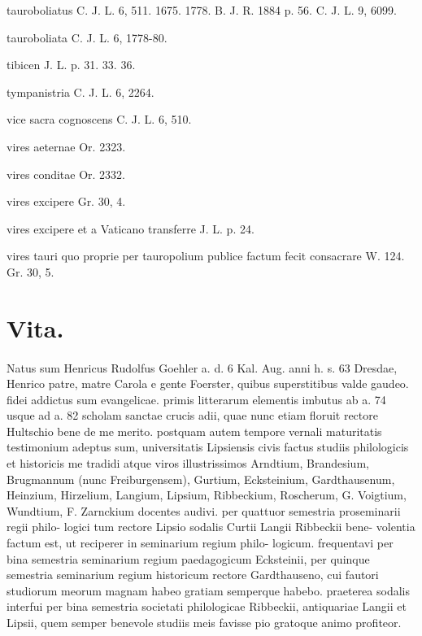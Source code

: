 \documentclass[a4paper, 11pt, oneside, polutonikogreek, german]{article}
\begin{document}
tauroboliatus C. J. L. 6, 511. 1675. 1778. B. J. R. 1884 p. 56. C. J. L. 9, 6099.

tauroboliata C. J. L. 6, 1778-80.

tibicen J. L. p. 31. 33. 36.

tympanistria C. J. L. 6, 2264.

vice sacra cognoscens C. J. L. 6, 510.

vires aeternae Or. 2323.

vires conditae Or. 2332.

vires excipere Gr. 30, 4.

vires excipere et a Vaticano transferre J. L. p. 24.

vires tauri quo proprie per tauropolium publice factum fecit consacrare W. 124. Gr. 30, 5.
\clearpage
\section{Vita.}
\paragraph{}
Natus sum Henricus Rudolfus Goehler a. d. 6 Kal. Aug. anni h. s. 63 Dresdae, Henrico patre, matre Carola e gente Foerster, quibus superstitibus valde gaudeo. fidei addictus sum evangelicae. primis litterarum elementis imbutus ab a. 74 usque ad a. 82 scholam sanctae crucis adii, quae nunc etiam floruit rectore Hultschio bene de me merito. postquam autem tempore vernali maturitatis testimonium adeptus sum, universitatis Lipsiensis civis factus studiis philologicis et historicis me tradidi atque viros illustrissimos Arndtium, Brandesium, Brugmannum (nunc Freiburgensem), Gurtium, Ecksteinium, Gardthausenum, Heinzium, Hirzelium, Langium, Lipsium, Ribbeckium, Roscherum, G. Voigtium, Wundtium, F. Zarnckium docentes audivi. per quattuor semestria proseminarii regii philo- logici tum rectore Lipsio sodalis Curtii Langii Ribbeckii bene- volentia factum est, ut reciperer in seminarium regium philo- logicum. frequentavi per bina semestria seminarium regium paedagogicum Ecksteinii, per quinque semestria seminarium regium historicum rectore Gardthauseno, cui fautori studiorum meorum magnam habeo gratiam semperque habebo. praeterea sodalis interfui per bina semestria societati philologicae Ribbeckii, antiquariae Langii et Lipsii, quem semper benevole studiis meis favisse pio gratoque animo profiteor.
\clearpage
\end{document}
